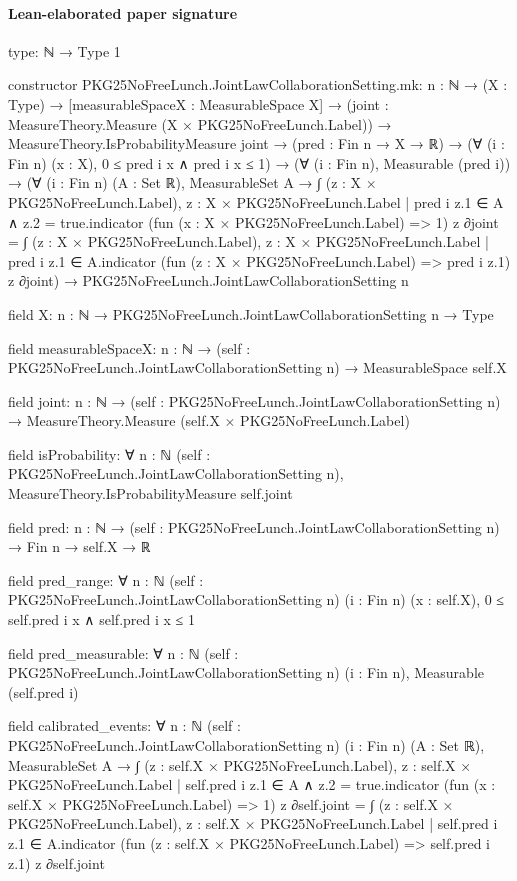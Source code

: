 \documentclass[10pt]{article}
\begin{document}
\paragraph{Lean-elaborated paper signature}
\begin{ReviewVerbatim}
type:
ℕ → Type 1

constructor PKG25NoFreeLunch.JointLawCollaborationSetting.mk:
{n : ℕ} →
  (X : Type) →
    [measurableSpaceX : MeasurableSpace X] →
      (joint : MeasureTheory.Measure (X × PKG25NoFreeLunch.Label)) →
        MeasureTheory.IsProbabilityMeasure joint →
          (pred : Fin n → X → ℝ) →
            (∀ (i : Fin n) (x : X), 0 ≤ pred i x ∧ pred i x ≤ 1) →
              (∀ (i : Fin n), Measurable (pred i)) →
                (∀ (i : Fin n) (A : Set ℝ),
                    MeasurableSet A →
                      ∫ (z : X × PKG25NoFreeLunch.Label),
                          {z : X × PKG25NoFreeLunch.Label | pred i z.1 ∈ A ∧ z.2 = true}.indicator
                            (fun (x : X × PKG25NoFreeLunch.Label) => 1) z ∂joint =
                        ∫ (z : X × PKG25NoFreeLunch.Label),
                          {z : X × PKG25NoFreeLunch.Label | pred i z.1 ∈ A}.indicator
                            (fun (z : X × PKG25NoFreeLunch.Label) => pred i z.1) z ∂joint) →
                  PKG25NoFreeLunch.JointLawCollaborationSetting n

field X:
{n : ℕ} → PKG25NoFreeLunch.JointLawCollaborationSetting n → Type

field measurableSpaceX:
{n : ℕ} → (self : PKG25NoFreeLunch.JointLawCollaborationSetting n) → MeasurableSpace self.X

field joint:
{n : ℕ} →
  (self : PKG25NoFreeLunch.JointLawCollaborationSetting n) → MeasureTheory.Measure (self.X × PKG25NoFreeLunch.Label)

field isProbability:
∀ {n : ℕ} (self : PKG25NoFreeLunch.JointLawCollaborationSetting n), MeasureTheory.IsProbabilityMeasure self.joint

field pred:
{n : ℕ} → (self : PKG25NoFreeLunch.JointLawCollaborationSetting n) → Fin n → self.X → ℝ

field pred_range:
∀ {n : ℕ} (self : PKG25NoFreeLunch.JointLawCollaborationSetting n) (i : Fin n) (x : self.X),
  0 ≤ self.pred i x ∧ self.pred i x ≤ 1

field pred_measurable:
∀ {n : ℕ} (self : PKG25NoFreeLunch.JointLawCollaborationSetting n) (i : Fin n), Measurable (self.pred i)

field calibrated_events:
∀ {n : ℕ} (self : PKG25NoFreeLunch.JointLawCollaborationSetting n) (i : Fin n) (A : Set ℝ),
  MeasurableSet A →
    ∫ (z : self.X × PKG25NoFreeLunch.Label),
        {z : self.X × PKG25NoFreeLunch.Label | self.pred i z.1 ∈ A ∧ z.2 = true}.indicator
          (fun (x : self.X × PKG25NoFreeLunch.Label) => 1) z ∂self.joint =
      ∫ (z : self.X × PKG25NoFreeLunch.Label),
        {z : self.X × PKG25NoFreeLunch.Label | self.pred i z.1 ∈ A}.indicator
          (fun (z : self.X × PKG25NoFreeLunch.Label) => self.pred i z.1) z ∂self.joint
\end{ReviewVerbatim}
\end{document}
